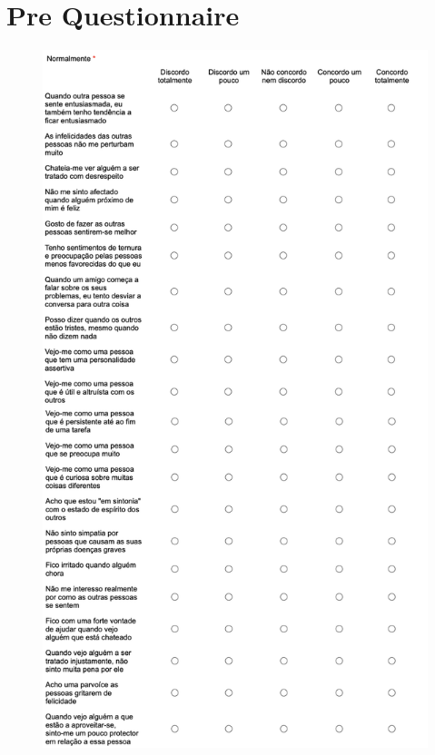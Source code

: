 \section{Pre Questionnaire}
\begin{figure}[h!]
\includegraphics[scale=0.25]{figures/pre.png}
\centering
\end{figure}

\clearpage
